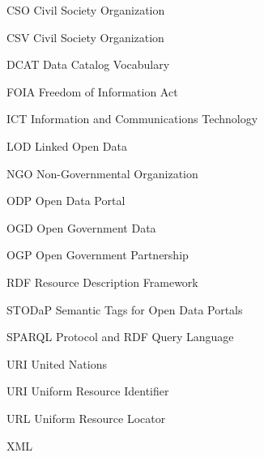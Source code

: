 
\begin{siglas}
	\item [CSO] Civil Society Organization
	\item [CSV] Civil Society Organization
	\item [DCAT] Data Catalog Vocabulary
	\item [FOIA] Freedom of Information Act
	\item [ICT] Information and Communications Technology
	\item [LOD] Linked Open Data
	\item [NGO] Non-Governmental Organization
	\item [ODP] Open Data Portal
	\item [OGD] Open Government Data
	\item [OGP] Open Government Partnership
	\item [RDF] Resource Description Framework
	\item [STODaP] Semantic Tags for Open Data Portals
	\item [SPARQL] Protocol and RDF Query Language
	\item [URI] United Nations
	\item [URI] Uniform Resource Identifier
	\item [URL] Uniform Resource Locator
	\item [XML] 
\end{siglas}
